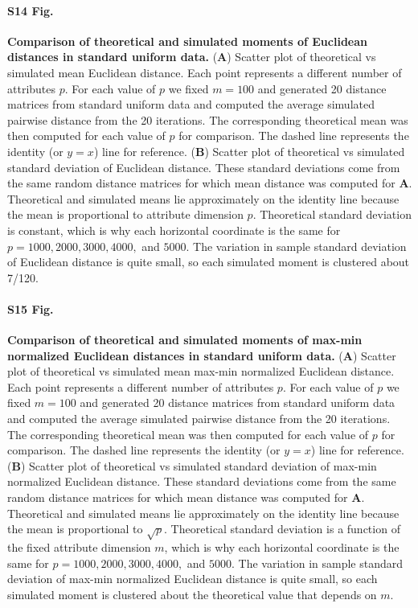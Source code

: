 \documentclass[10pt,letterpaper]{article}
\begin{document}
\paragraph*{S14 Fig.}
\label{S14_Fig}
{\bf Comparison of theoretical and simulated moments of Euclidean distances in standard uniform data.} (\textbf{A}) Scatter plot of theoretical vs simulated mean Euclidean distance. Each point represents a different number of attributes $p$. For each value of $p$ we fixed $m=100$ and generated 20 distance matrices from standard uniform data and computed the average simulated pairwise distance from the 20 iterations. The corresponding theoretical mean was then computed for each value of $p$ for comparison. The dashed line represents the identity (or $y=x$) line for reference. (\textbf{B}) Scatter plot of theoretical vs simulated standard deviation of Euclidean distance. These standard deviations come from the same random distance matrices for which mean distance was computed for \textbf{A}. Theoretical and simulated means lie approximately on the identity line because the mean is proportional to attribute dimension $p$. Theoretical standard deviation is constant, which is why each horizontal coordinate is the same for $p=1000,2000,3000,4000,$ and $5000$. The variation in sample standard deviation of Euclidean distance is quite small, so each simulated moment is clustered about 7/120.

\paragraph*{S15 Fig.}
\label{S15_Fig}
{\bf Comparison of theoretical and simulated moments of max-min normalized Euclidean distances in standard uniform data.} (\textbf{A}) Scatter plot of theoretical vs simulated mean max-min normalized Euclidean distance. Each point represents a different number of attributes $p$. For each value of $p$ we fixed $m=100$ and generated 20 distance matrices from standard uniform data and computed the average simulated pairwise distance from the 20 iterations. The corresponding theoretical mean was then computed for each value of $p$ for comparison. The dashed line represents the identity (or $y=x$) line for reference. (\textbf{B}) Scatter plot of theoretical vs simulated standard deviation of max-min normalized Euclidean distance. These standard deviations come from the same random distance matrices for which mean distance was computed for \textbf{A}. Theoretical and simulated means lie approximately on the identity line because the mean is proportional to $\sqrt{p}$. Theoretical standard deviation is a function of the fixed attribute dimension $m$, which is why each horizontal coordinate is the same for $p=1000,2000,3000,4000,$ and $5000$. The variation in sample standard deviation of max-min normalized Euclidean distance is quite small, so each simulated moment is clustered about the theoretical value that depends on $m$.
\end{document}
